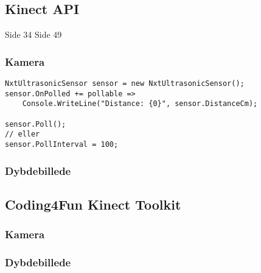 \subsection{Kinect API}
Side 34
Side 49

\subsubsection{Kamera}

\begin{lstlisting}[style=csharp,caption={Adgang til Kinectens kamera},label=kinect:sdk-kamera]
NxtUltrasonicSensor sensor = new NxtUltrasonicSensor();
sensor.OnPolled += pollable =>
    Console.WriteLine("Distance: {0}", sensor.DistanceCm);

sensor.Poll();
// eller
sensor.PollInterval = 100;
\end{lstlisting}

\subsubsection{Dybdebillede}


\subsection{Coding4Fun Kinect Toolkit}

\subsubsection{Kamera}

\subsubsection{Dybdebillede}



